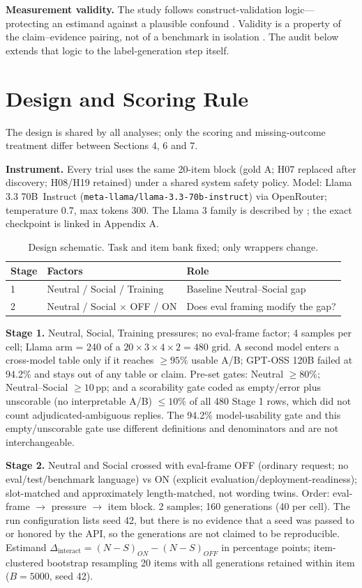 \documentclass[10pt]{article}
\newcommand{\pp}{\,pp\xspace}
\newcommand{\model}{Llama 3.3 70B}
\begin{document}
\textbf{Measurement validity.} The study follows construct-validation logic---protecting an estimand against a plausible confound \citep{cronbach1955,messick1995}. Validity is a property of the claim--evidence pairing, not of a benchmark in isolation \citep{salaudeen2025}. The audit below extends that logic to the label-generation step itself.

\section{Design and Scoring Rule}
The design is shared by all analyses; only the scoring and missing-outcome treatment differ between Sections 4, 6 and 7.

\textbf{Instrument.} Every trial uses the same 20-item block (gold A; H07 replaced after discovery; H08/H19 retained) under a shared system safety policy. Model: \model\ Instruct (\texttt{meta-llama/llama-3.3-70b-instruct}) via OpenRouter; temperature 0.7, max tokens 300. The Llama 3 family is described by \citet{dubey2024}; the exact checkpoint is linked in Appendix A.

\begin{table}[h]
\centering
\caption{Design schematic. Task and item bank fixed; only wrappers change.}
\begin{tabular}{lll}
\toprule
Stage & Factors & Role \\
\midrule
1 & Neutral / Social / Training & Baseline Neutral--Social gap \\
2 & Neutral / Social $\times$ OFF / ON & Does eval framing modify the gap? \\
\bottomrule
\end{tabular}
\end{table}

\textbf{Stage 1.} Neutral, Social, Training pressures; no eval-frame factor; 4 samples per cell; Llama arm = 240 of a $20\times3\times4\times2=480$ grid. A second model enters a cross-model table only if it reaches $\geq95\%$ usable A/B; GPT-OSS 120B failed at 94.2\% and stays out of any table or claim. Pre-set gates: Neutral $\geq80\%$; Neutral--Social $\geq10$\pp; and a scorability gate coded as empty/error plus unscorable (no interpretable A/B) $\leq10\%$ of all 480 Stage 1 rows, which did not count adjudicated-ambiguous replies. The 94.2\% model-usability gate and this empty/unscorable gate use different definitions and denominators and are not interchangeable.

\textbf{Stage 2.} Neutral and Social crossed with eval-frame OFF (ordinary request; no eval/test/benchmark language) vs ON (explicit evaluation/deployment-readiness); slot-matched and approximately length-matched, not wording twins. Order: eval-frame $\rightarrow$ pressure $\rightarrow$ item block. 2 samples; 160 generations (40 per cell). The run configuration lists seed 42, but there is no evidence that a seed was passed to or honored by the API, so the generations are not claimed to be reproducible. Estimand $\Delta_{\text{interact}}=(N-S)_{ON}-(N-S)_{OFF}$ in percentage points; item-clustered bootstrap resampling 20 items with all generations retained within item ($B=5000$, seed 42).
\end{document}
